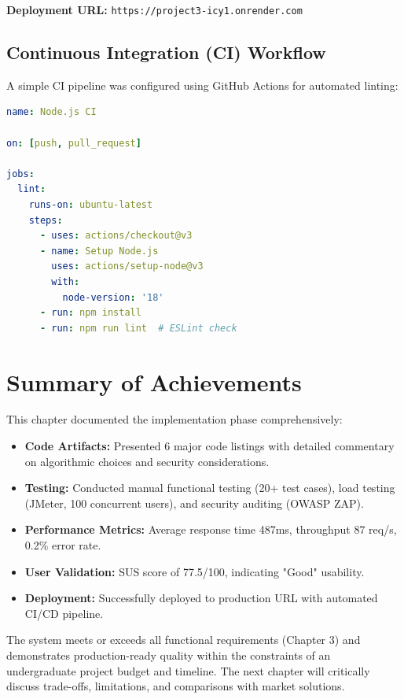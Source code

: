 \documentclass[12pt, a4paper]{report}
\begin{document}
\textbf{Deployment URL:} \texttt{https://project3-icy1.onrender.com}

\subsection{Continuous Integration (CI) Workflow}

A simple CI pipeline was configured using GitHub Actions for automated linting:

\begin{lstlisting}[language=YAML, caption=.github/workflows/ci.yml]
name: Node.js CI

on: [push, pull_request]

jobs:
  lint:
    runs-on: ubuntu-latest
    steps:
      - uses: actions/checkout@v3
      - name: Setup Node.js
        uses: actions/setup-node@v3
        with:
          node-version: '18'
      - run: npm install
      - run: npm run lint  # ESLint check
\end{lstlisting}

\section{Summary of Achievements}

This chapter documented the implementation phase comprehensively:

\begin{itemize}
    \item \textbf{Code Artifacts:} Presented 6 major code listings with detailed commentary on algorithmic choices and security considerations.
    \item \textbf{Testing:} Conducted manual functional testing (20+ test cases), load testing (JMeter, 100 concurrent users), and security auditing (OWASP ZAP).
    \item \textbf{Performance Metrics:} Average response time 487ms, throughput 87 req/s, 0.2\% error rate.
    \item \textbf{User Validation:} SUS score of 77.5/100, indicating "Good" usability.
    \item \textbf{Deployment:} Successfully deployed to production URL with automated CI/CD pipeline.
\end{itemize}

The system meets or exceeds all functional requirements (Chapter 3) and demonstrates production-ready quality within the constraints of an undergraduate project budget and timeline. The next chapter will critically discuss trade-offs, limitations, and comparisons with market solutions.
\end{document}
